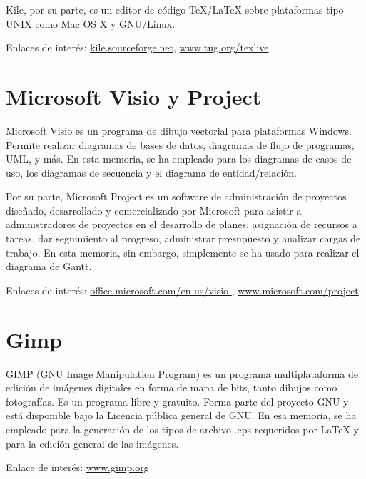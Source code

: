 Kile, por su parte, es un editor de código TeX/LaTeX sobre plataformas tipo
UNIX como Mac OS X y GNU/Linux.

Enlaces de interés: \href{http://kile.sourceforge.net/}{kile.sourceforge.net},
\href{ http://www.tug.org/texlive/}{www.tug.org/texlive}

\section*{Microsoft Visio y Project}

Microsoft Visio es un programa de dibujo vectorial para plataformas Windows.
Permite realizar diagramas de bases de datos, diagramas de flujo de programas,
UML, y más. En esta memoria, se ha empleado para los diagramas de casos de uso,
los diagramas de secuencia y  el diagrama de entidad/relación.

Por su parte, Microsoft Project es un software de administración de proyectos
diseñado, desarrollado y comercializado por Microsoft para asistir a
administradores de proyectos en el desarrollo de planes, asignación de recursos
a tareas, dar seguimiento al progreso, administrar presupuesto y analizar cargas
de trabajo. En esta memoria, sin embargo, simplemente se ha usado para realizar
el diagrama de Gantt.

Enlaces de interés:
\href{http://office.microsoft.com/en-us/visio/}{office.microsoft.com/en-us/visio
}, \newline \href{http://www.microsoft.com/project}{www.microsoft.com/project}

\section*{Gimp}

GIMP (GNU Image Manipulation Program) es un programa multiplataforma de edición
de imágenes digitales en forma de mapa de bits, tanto dibujos como fotografías.
Es un programa libre y gratuito. Forma parte del proyecto GNU y está disponible
bajo la Licencia pública general de GNU. En esa memoria, se ha empleado para la
generación de los tipos de archivo .eps requeridos por LaTeX y para la edición
general de las imágenes.

Enlace de interés: \href{http://www.gimp.org/}{www.gimp.org}
